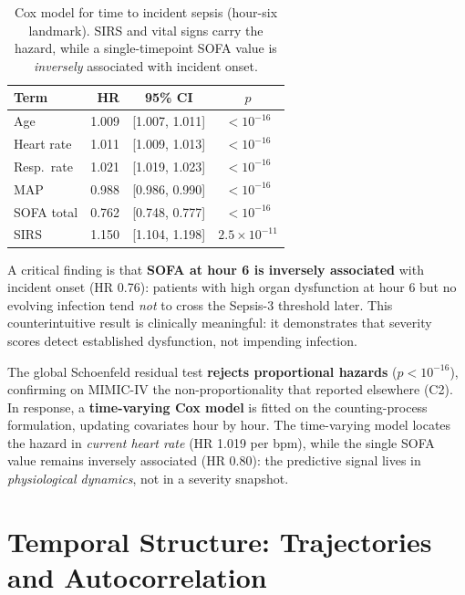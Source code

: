 \begin{table}[H]
    \centering
    \begin{tabular}{l|r|c|c}
        \hline
        \textbf{Term} & \textbf{HR} & \textbf{95\% CI} & \textbf{$p$} \\
        \hline\hline
        Age           & 1.009 & [1.007, 1.011] & $< 10^{-16}$ \\
        Heart rate    & 1.011 & [1.009, 1.013] & $< 10^{-16}$ \\
        Resp.\ rate   & 1.021 & [1.019, 1.023] & $< 10^{-16}$ \\
        MAP           & 0.988 & [0.986, 0.990] & $< 10^{-16}$ \\
        SOFA total    & 0.762 & [0.748, 0.777] & $< 10^{-16}$ \\
        SIRS          & 1.150 & [1.104, 1.198] & $2.5 \times 10^{-11}$ \\
        \hline
    \end{tabular}
    \caption{Cox model for time to incident sepsis (hour-six landmark). SIRS
    and vital signs carry the hazard, while a single-timepoint SOFA value is
    \emph{inversely} associated with incident onset.}
    \label{table:cox_baseline}
\end{table}

A critical finding is that \textbf{SOFA at hour 6 is inversely associated}
with incident onset (HR 0.76): patients with high organ dysfunction at hour 6
but no evolving infection tend \emph{not} to cross the Sepsis-3 threshold
later. This counterintuitive result is clinically meaningful: it demonstrates
that severity scores detect established dysfunction, not impending infection.

The global Schoenfeld residual test \textbf{rejects proportional hazards}
($p < 10^{-16}$), confirming on MIMIC-IV the non-proportionality that
\textcite{kasal2004cox} reported elsewhere (C2). In response, a
\textbf{time-varying Cox model} is fitted on the counting-process formulation,
updating covariates hour by hour. The time-varying model locates the hazard
in \emph{current heart rate} (HR 1.019 per bpm), while the single SOFA value
remains inversely associated (HR 0.80): the predictive signal lives in
\emph{physiological dynamics}, not in a severity snapshot.

\section{Temporal Structure: Trajectories and Autocorrelation}

